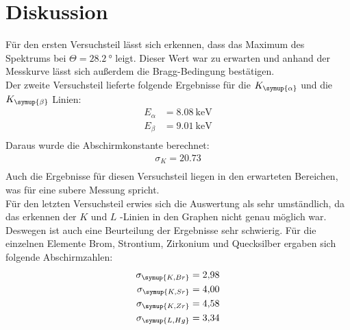 \section{Diskussion}
\label{sec:Diskussion}

Für den ersten Versuchsteil lässt sich erkennen, dass das Maximum des Spektrums
bei $\Theta = \SI{28.2}{\degree}$ leigt. Dieser Wert war zu erwarten und anhand der
Messkurve lässt sich außerdem die Bragg-Bedingung bestätigen.\\
Der zweite Versuchsteil lieferte folgende Ergebnisse für die $K_\symup{\alpha}$ und
die $K_\symup{\beta}$ Linien:\\
\begin{align*}
  E_\alpha &= \SI{8.08}{\kilo\eV}\\
  E_\beta &= \SI{9.01}{\kilo\eV}\\
\end{align*}
Daraus wurde die Abschirmkonstante berechnet:\\
\begin{align*}
  \sigma_K = \num{20.73}\\
\end{align*}
Auch die Ergebnisse für diesen Versuchsteil liegen in den erwarteten Bereichen,
was für eine subere Messung spricht.\\
Für den letzten Versuchsteil erwies sich die Auswertung als sehr umständlich, da
das erkennen der $K$ und $L$ -Linien in den Graphen nicht genau möglich war. Deswegen
ist auch eine Beurteilung der Ergebnisse sehr schwierig. Für die einzelnen
Elemente Brom, Strontium, Zirkonium und Quecksilber ergaben sich folgende
Abschirmzahlen:
\begin{align*}
  \sigma_\symup{K,Br} &= \num{2.98}\\
  \sigma_\symup{K,Sr} &= \num{4.00}\\
  \sigma_\symup{K,Zr} &= \num{4.58}\\
  \sigma_\symup{L,Hg} &= \num{3.34}\\
\end{align*}
